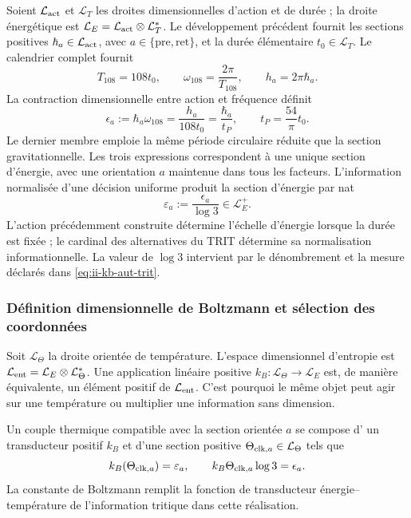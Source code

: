 Soient \(\mathcal L_{\rm act}\) et \(\mathcal L_T\) les droites
dimensionnelles d'action et de durée ; la droite énergétique est
\(\mathcal L_E=\mathcal L_{\rm act}\otimes\mathcal L_T^*\).
Le développement précédent fournit les sections positives
\(\hbar_a\in\mathcal L_{\rm act}\), avec
\(a\in\{\mathrm{pre},\mathrm{ret}\}\), et la durée élémentaire
\(t_0\in\mathcal L_T\). Le calendrier complet fournit
\[
 T_{108}=108t_0,\qquad
 \omega_{108}=\frac{2\pi}{T_{108}},\qquad
 h_a=2\pi\hbar_a.
\]
La contraction dimensionnelle entre action et fréquence définit
\begin{equation}
 \epsilon_a:=\hbar_a\omega_{108}
 =\frac{h_a}{108t_0}
 =\frac{\hbar_a}{t_P},\qquad
 t_P=\frac{54}{\pi}t_0.
 \label{eq:ii-kb-aut-energia}
\end{equation}
Le dernier membre emploie la même période circulaire réduite que la section gravitationnelle. Les trois expressions correspondent à une unique section d'énergie, avec une orientation \(a\) maintenue dans tous les facteurs. L'information normalisée d'une décision uniforme produit la section d'énergie par nat
\begin{equation}
 \varepsilon_a:=\frac{\epsilon_a}{\log3}\in\mathcal L_E^+.
 \label{eq:ii-kb-aut-energia-nat}
\end{equation}
L'action précédemment construite détermine l'échelle d'énergie lorsque
la durée est fixée ; le cardinal des alternatives du TRIT détermine sa
normalisation informationnelle. La valeur de \(\log3\) intervient par le
dénombrement et la mesure déclarés dans \eqref{eq:ii-kb-aut-trit}.

\subsubsection{Définition dimensionnelle de Boltzmann et sélection des coordonnées}

Soit \(\mathcal L_\Theta\) la droite orientée de température. L'espace dimensionnel d'entropie est \(\mathcal L_{\rm ent}=\mathcal L_E\otimes\mathcal L_\Theta^*\). Une application linéaire positive \(k_B:\mathcal L_\Theta\to\mathcal L_E\) est, de manière équivalente, un élément positif de \(\mathcal L_{\rm ent}\). C'est pourquoi le même objet peut agir sur une température ou multiplier une information sans dimension.

\begin{definition}
Un couple thermique compatible avec la section orientée \(a\) se compose d'
un transducteur positif \(k_B\) et d'une section positive
\(\Theta_{{\rm clk},a}\in\mathcal L_\Theta\) tels que
\begin{equation}
 k_B(\Theta_{{\rm clk},a})=\varepsilon_a,
 \qquad
 k_B\Theta_{{\rm clk},a}\log3=\epsilon_a.
 \label{eq:ii-kb-aut-par-termico}
\end{equation}
La constante de Boltzmann remplit la fonction de transducteur
énergie--température de l'information tritique dans cette réalisation.
\end{definition}

